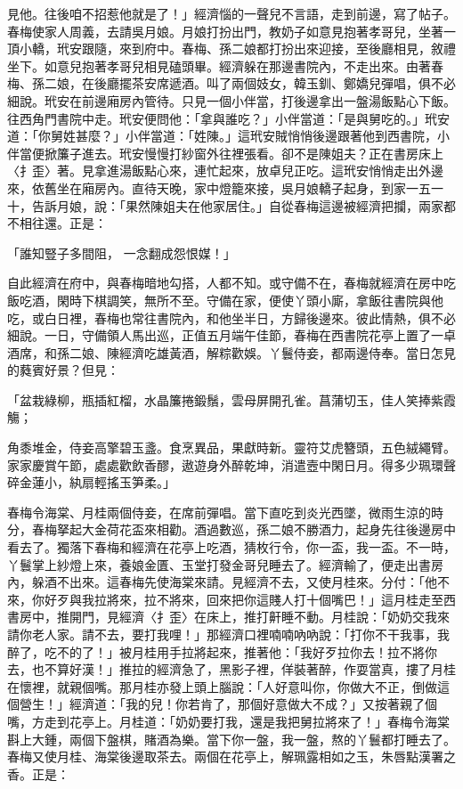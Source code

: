\begin{showcontents}{}
見他。往後咱不招惹他就是了！」經濟惱的一聲兒不言語，走到前邊，寫了帖子。春梅使家人周義，去請吳月娘。月娘打扮出門，教奶子如意見抱著孝哥兒，坐著一頂小轎，玳安跟隨，來到府中。春梅、孫二娘都打扮出來迎接，至後廳相見，敘禮坐下。如意兒抱著孝哥兒相見磕頭畢。經濟躲在那邊書院內，不走出來。由著春梅、孫二娘，在後廳擺茶安席遞酒。叫了兩個妓女，韓玉釧、鄭嬌兒彈唱，俱不必細說。玳安在前邊廂房內管待。只見一個小伴當，打後邊拿出一盤湯飯點心下飯。往西角門書院中走。玳安便問他：「拿與誰吃？」小伴當道：「是與舅吃的。」玳安道：「你舅姓甚麼？」小伴當道：「姓陳。」這玳安賊悄悄後邊跟著他到西書院，小伴當便掀簾子進去。玳安慢慢打紗窗外往裡張看。卻不是陳姐夫？正在書房床上〈扌歪〉著。見拿進湯飯點心來，連忙起來，放卓兒正吃。這玳安悄悄走出外邊來，依舊坐在廂房內。直待天晚，家中燈籠來接，吳月娘轎子起身，到家一五一十，告訴月娘，說：「果然陳姐夫在他家居住。」自從春梅這邊被經濟把攔，兩家都不相往還。正是：

「誰知豎子多間阻，  一念翻成怨恨媒！」

自此經濟在府中，與春梅暗地勾搭，人都不知。或守備不在，春梅就經濟在房中吃飯吃酒，閑時下棋調笑，無所不至。守備在家，便使丫頭小廝，拿飯往書院與他吃，或白日裡，春梅也常往書院內，和他坐半日，方歸後邊來。彼此情熱，俱不必細說。一日，守備領人馬出巡，正值五月端午佳節，春梅在西書院花亭上置了一卓酒席，和孫二娘、陳經濟吃雄黃酒，解粽歡娛。丫鬟侍妾，都兩邊侍奉。當日怎見的蕤賓好景？但見：

「盆栽綠柳，瓶插紅榴，水晶簾捲鍛鬚，雲母屏開孔雀。菖蒲切玉，佳人笑捧紫霞觴；

角黍堆金，侍妾高擎碧玉盞。食烹異品，果獻時新。靈符艾虎簪頭，五色絨繩臂。家家慶賞午節，處處歡飲香醪，遨遊身外醉乾坤，消遣壼中閑日月。得多少珮環聲碎金蓮小，紈扇輕搖玉笋柔。」

春梅令海棠、月桂兩個侍妾，在席前彈唱。當下直吃到炎光西墜，微雨生涼的時分，春梅拏起大金荷花盃來相勸。酒過數巡，孫二娘不勝酒力，起身先往後邊房中看去了。獨落下春梅和經濟在花亭上吃酒，猜枚行令，你一盃，我一盃。不一時，丫鬟掌上紗燈上來，養娘金匱、玉堂打發金哥兒睡去了。經濟輸了，便走出書房內，躲酒不出來。這春梅先使海棠來請。見經濟不去，又使月桂來。分付：「他不來，你好歹與我拉將來，拉不將來，回來把你這賤人打十個嘴巴！」這月桂走至西書房中，推開門，見經濟〈扌歪〉在床上，推打鼾睡不動。月桂說：「奶奶交我來請你老人家。請不去，要打我哩！」那經濟口裡喃喃吶吶說：「打你不干我事，我醉了，吃不的了！」被月桂用手拉將起來，推著他：「我好歹拉你去！拉不將你去，也不算好漢！」推拉的經濟急了，黑影子裡，佯裝著醉，作耍當真，摟了月桂在懷裡，就親個嘴。那月桂亦發上頭上腦說：「人好意叫你，你做大不正，倒做這個營生！」經濟道：「我的兒！你若肯了，那個好意做大不成？」又按著親了個嘴，方走到花亭上。月桂道：「奶奶要打我，還是我把舅拉將來了！」春梅令海棠斟上大鍾，兩個下盤棋，賭酒為樂。當下你一盤，我一盤，熬的丫鬟都打睡去了。春梅又使月桂、海棠後邊取茶去。兩個在花亭上，解珮露相如之玉，朱唇點漢署之香。正是：


\end{showcontents}
